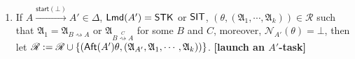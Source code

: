 \documentclass[preprint,12pt]{elsarticle}
\newcommand\act{{\sf Act}}
\newcommand\aft{{\sf Aft}}
\newcommand\lmd{{\sf Lmd}}
\newcommand\singletask{{\sf STK}}
\newcommand\singleinstance{{\sf SIT}}
\newcommand\startactivity{{\mathsf{start} }}
\newcommand\namefun{\mathcal{N}}
\newcommand\AutReach{\mathscr{R}}
\newcommand{\STK}{\mathsf{STK}}
\newcommand{\SIT}{\mathsf{SIT}}
\newcommand\Aut{{\mathfrak{A} }}
\newcommand\Lang{{\mathscr{L} }}
\begin{document}
\smallskip
\fbox
{
\begin{minipage}{\textwidth}
{\small
\begin{enumerate}
    \item If $A \xrightarrow{\startactivity(\bot)}A' \in\Delta$, $\lmd(A')=\STK$ or $\singleinstance$, $(\theta, (\Aut_1,\cdots,\Aut_k)) \in \AutReach$ such that 
    $\Aut_1 = \Aut_{B \rightsquigarrow A}$ or $\Aut_{B \stackrel{C}{\rightsquigarrow} A}$ for some $B$ and $C$,
    moreover, $\namefun_{A'}(\theta) = \bot$,
    then let $\AutReach: = \AutReach \cup \{(\aft(A')\theta, (\Aut_{A'},\Aut_1,\cdots,\Aut_k))\}$.
        \textbf{[launch an $A'$-task]}


\end{enumerate}}
\end{minipage}}
\end{document}
